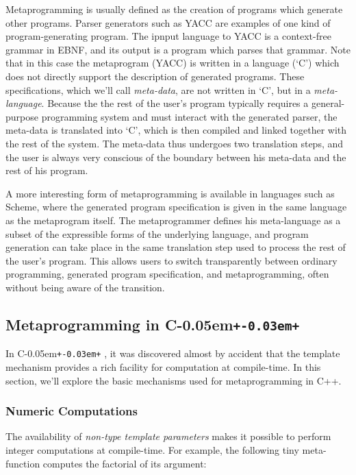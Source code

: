 \documentclass{netobjectdays}
\newcommand{\Cpp}{C\kern-0.05em\texttt{+\kern-0.03em+}%
}
\newcommand{\mping}{meta\-program\-ming}
\newcommand{\mpgm}{meta\-program}
\begin{document}
Metaprogramming is usually defined as the creation of programs which
generate other programs. Parser generators such as YACC are examples
of one kind of program-generating program. The ipnput language to YACC
is a context-free grammar in EBNF, and its output is a program which
parses that grammar. Note that in this case the \mpgm{} (YACC) is
written in a language (`C') which does not directly support the
description of generated programs. These specifications, which we'll
call \emph{meta-data}, are not written in `C', but in a
\emph{meta-language}. Because the the rest of the user's program
typically requires a general-purpose programming system and must
interact with the generated parser, the meta-data is translated into
`C', which is then compiled and linked together with the rest of the
system. The meta-data thus undergoes two translation steps, and the
user is always very conscious of the boundary between his meta-data
and the rest of his program.

A more interesting form of \mping{} is available in languages
such as Scheme, where the generated program specification is given in
the same language as the \mpgm{} itself. The metaprogrammer
defines his meta-language as a subset of the expressible forms of the
underlying language, and program generation can take place in the same
translation step used to process the rest of the user's program. This
allows users to switch transparently between ordinary programming,
generated program specification, and \mping{}, often without
being aware of the transition.

\subsection{Metaprogramming in \Cpp{}}

In \Cpp, it was discovered almost by accident that the template
mechanism provides a rich facility for computation at compile-time. In
this section, we'll explore the basic mechanisms used for
metaprogramming in C++.

\subsubsection{Numeric Computations}

The availability of \emph{non-type template parameters} makes it
possible to perform integer computations at compile-time. For example,
the following tiny meta-function computes the factorial of its
argument:
\end{document}
